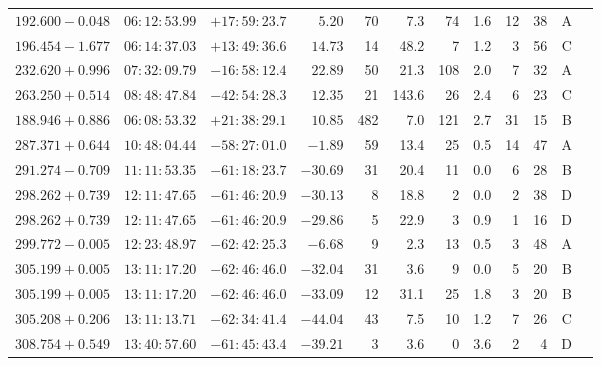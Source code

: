 {\begin{longtable}{c rrr rrrrr rr c}
    $192.600-0.048$     &   $06:12:53.99$     &   $+17:59:23.7$     &   $5.20    $    &   70     &    7.3    &    74  &   1.6 &   12  &   38  &   A   \\
    $196.454-1.677$     &   $06:14:37.03$     &   $+13:49:36.6$     &   $14.73   $    &   14     &   48.2    &    7   &   1.2 &   3   &   56  &   C   \\
    $232.620+0.996$     &   $07:32:09.79$     &   $-16:58:12.4$     &   $22.89   $    &   50     &   21.3    &    108 &   2.0 &   7   &   32  &   A   \\
    $263.250+0.514$     &   $08:48:47.84$     &   $-42:54:28.3$     &   $12.35   $    &   21     &  143.6    &    26  &   2.4 &   6   &   23  &   C   \\
    $188.946+0.886$     &   $06:08:53.32$     &   $+21:38:29.1$     &   $10.85   $    &   482    &    7.0    &    121 &   2.7 &   31  &   15  &   B   \\
    $287.371+0.644$     &   $10:48:04.44$     &   $-58:27:01.0$     &   $-1.89   $    &   59     &   13.4    &    25  &   0.5 &   14  &   47  &   A   \\
    $291.274-0.709$     &   $11:11:53.35$     &   $-61:18:23.7$     &   $-30.69  $    &   31     &   20.4    &    11  &   0.0 &   6   &   28  &   B   \\
    $298.262+0.739$     &   $12:11:47.65$     &   $-61:46:20.9$     &   $-30.13  $    &   8      &   18.8    &    2   &   0.0 &   2   &   38  &   D   \\
    $298.262+0.739$     &   $12:11:47.65$     &   $-61:46:20.9$     &   $-29.86  $    &   5      &   22.9    &    3   &   0.9 &   1   &   16  &   D   \\
    $299.772-0.005$     &   $12:23:48.97$     &   $-62:42:25.3$     &   $-6.68   $    &   9      &    2.3    &    13  &   0.5 &   3   &   48  &   A   \\
    $305.199+0.005$     &   $13:11:17.20$     &   $-62:46:46.0$     &   $-32.04  $    &   31     &    3.6    &    9   &   0.0 &   5   &   20  &   B   \\
    $305.199+0.005$     &   $13:11:17.20$     &   $-62:46:46.0$     &   $-33.09  $    &   12     &   31.1    &    25  &   1.8 &   3   &   20  &   B   \\
    $305.208+0.206$     &   $13:11:13.71$     &   $-62:34:41.4$     &   $-44.04  $    &   43     &    7.5    &    10  &   1.2 &   7   &   26  &   C   \\
    $308.754+0.549$     &   $13:40:57.60$     &   $-61:45:43.4$     &   $-39.21  $    &   3      &    3.6    &    0   &   3.6 &   2   &   4   &   D   \\

\end{longtable}}
